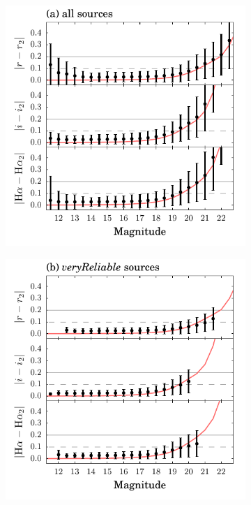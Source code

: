 \documentclass[useAMS,usenatbib]{mn2e}
\begin{document}
\begin{figure}
\captionsetup[subfigure]{labelformat=empty}
\begin{subfigure}[b]{0.45\linewidth}
\centering
\includegraphics[width=\textwidth]{figures/repeatability/repeatability.pdf}
\caption{}
\label{fig:pairmag}
\end{subfigure}
\hspace{0.5cm}
\begin{subfigure}[b]{0.45\linewidth}
\centering
\includegraphics[width=\textwidth]{figures/repeatability/repeatability-reliable.pdf}

\end{subfigure}
\end{figure}
\end{document}
